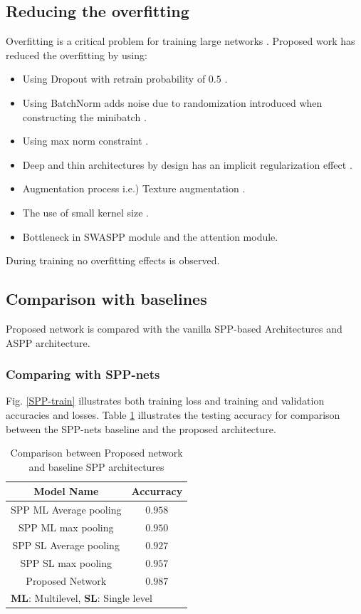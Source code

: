\subsection{Reducing the overfitting}
Overfitting is a critical problem for training large networks \cite{krizhevsky2012imagenet}. Proposed work has reduced the overfitting by using:
\begin{itemize}
\item Using Dropout with retrain probability of $0.5$ \cite{srivastava2014dropout}.
\item Using BatchNorm adds noise due to randomization introduced when constructing the minibatch \cite{ioffe2015batch}.
\item Using max norm constraint \cite{krizhevsky2012imagenet}.
\item Deep and thin architectures by design has an implicit regularization effect \cite{he2016deep}. 
\item Augmentation process i.e.) Texture augmentation \cite{krizhevsky2012imagenet}. 
\item The use of small kernel size \cite{simonyan2014very}.
\item Bottleneck in SWASPP module and the attention module.
\end{itemize}
During training no overfitting effects is observed.
\subsection{Comparison with baselines}
Proposed network is compared with the vanilla SPP-based Architectures and ASPP architecture.
\subsubsection{Comparing with SPP-nets}
Fig. \ref{SPP-train} illustrates both training loss and training and validation accuracies and losses. Table \ref{blaccom} illustrates the testing accuracy for comparison between the SPP-nets baseline and the proposed architecture.
\begin{table}[htbp]
\caption{Comparison between Proposed network and baseline SPP architectures }
\begin{center}
\begin{tabular}{|c|c|}
\hline
\textbf{Model Name}& Accurracy \\
\hline
 SPP ML Average pooling & $0.958$   \\
\hline
SPP ML max pooling & $0.950$   \\
\hline
  SPP SL Average pooling & $0.927$   \\
\hline
  SPP SL max pooling & $0.957$ \\
\hline
Proposed Network & $0.987$\\
\hline
\multicolumn{2}{l}{ \textbf{ML}: Multilevel, \textbf{SL}: Single level}
\end{tabular}
\label{blaccom}
\end{center}
\end{table}

